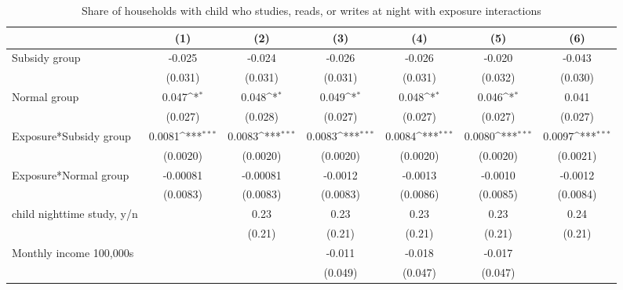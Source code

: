 \begin{table}[htbp]\centering
\def\sym#1{\ifmmode^{#1}\else\(^{#1}\)\fi}
\caption{Share of households with child who studies, reads, or writes at night with exposure interactions}
\begin{tabular*}{1\hsize}{@{\hskip\tabcolsep\extracolsep\fill}l*{6}{c}}
\toprule
                &\multicolumn{1}{c}{(1)}         &\multicolumn{1}{c}{(2)}         &\multicolumn{1}{c}{(3)}         &\multicolumn{1}{c}{(4)}         &\multicolumn{1}{c}{(5)}         &\multicolumn{1}{c}{(6)}         \\
\midrule
Subsidy group   &   -0.025         &   -0.024         &   -0.026         &   -0.026         &   -0.020         &   -0.043         \\
                &  (0.031)         &  (0.031)         &  (0.031)         &  (0.031)         &  (0.032)         &  (0.030)         \\
Normal group    &    0.047\sym{*}  &    0.048\sym{*}  &    0.049\sym{*}  &    0.048\sym{*}  &    0.046\sym{*}  &    0.041         \\
                &  (0.027)         &  (0.028)         &  (0.027)         &  (0.027)         &  (0.027)         &  (0.027)         \\
Exposure*Subsidy group&   0.0081\sym{***}&   0.0083\sym{***}&   0.0083\sym{***}&   0.0084\sym{***}&   0.0080\sym{***}&   0.0097\sym{***}\\
                & (0.0020)         & (0.0020)         & (0.0020)         & (0.0020)         & (0.0020)         & (0.0021)         \\
Exposure*Normal group& -0.00081         & -0.00081         &  -0.0012         &  -0.0013         &  -0.0010         &  -0.0012         \\
                & (0.0083)         & (0.0083)         & (0.0083)         & (0.0086)         & (0.0085)         & (0.0084)         \\
child nighttime study, y/n&                  &     0.23         &     0.23         &     0.23         &     0.23         &     0.24         \\
                &                  &   (0.21)         &   (0.21)         &   (0.21)         &   (0.21)         &   (0.21)         \\
Monthly income 100,000s&                  &                  &   -0.011         &   -0.018         &   -0.017         &                  \\
                &                  &                  &  (0.049)         &  (0.047)         &  (0.047)         &                  \\

\end{tabular*}
\end{table}

